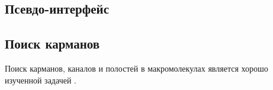 



\subsection{Псевдо-интерфейс}


\newpage
\subsection{Поиск карманов}
Поиск карманов, каналов и полостей в макромолекулах является хорошо изученной задачей \cite{alpha_shapes1995, alpha_shapes1998, caver2007, ppi_kim2006}.  

